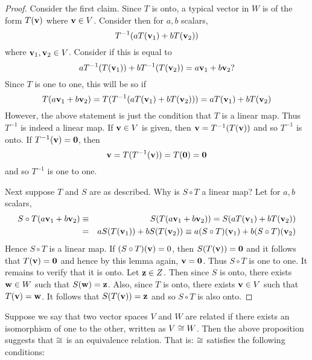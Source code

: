 \begin{proof}
Consider the first claim. Since $T$ is onto, a typical
vector in $W$ is of the form $T(\mbox{\bf v})$ where $\mbox{\bf v} \in V$. Consider then for $a,b$
scalars,
\begin{equation*}
T^{-1}(aT(\mbox{\bf v}_{1})+bT(\mbox{\bf v}_{2}))
\end{equation*}
where $\mbox{\bf v}_{1}, \mbox{\bf v}_2 \in V$. Consider if this is equal to
\begin{equation*}
aT^{-1}(T(\mbox{\bf v}_{1})) +bT^{-1}(T(\mbox{\bf v}_{2})) =a\mbox{\bf v}_{1}+b\mbox{\bf v}_{2}?
\end{equation*}
Since $T$ is one to one, this will be so if
\begin{equation*}
T(a\mbox{\bf v}_{1}+b\mbox{\bf v}_{2}) =T(T^{-1}(aT(\mbox{\bf v}_{1})+bT(\mbox{\bf v}_{2}))
) =aT(\mbox{\bf v}_{1})+bT(\mbox{\bf v}_{2})
\end{equation*}
However, the above statement is just the condition that $T$ is a linear map.
Thus $T^{-1}$ is indeed a linear map. If $\mbox{\bf v} \in V$ is given, then $
\mbox{\bf v}=T^{-1}(T(\mbox{\bf v})) $ and so $T^{-1}$ is onto. If $T^{-1}(\mbox{\bf v})=\mbox{\bf 0}$, then
\begin{equation*}
\mbox{\bf v}=T(T^{-1}(\mbox{\bf v})) =T(\mbox{\bf 0})=\mbox{\bf 0}
\end{equation*}
and so  $T^{-1}$ is one to one.

Next suppose $T$ and $S$ are as described. Why is $S\circ T$ a linear map?
Let for $a,b$ scalars,
\begin{eqnarray*}
S\circ T(a\mbox{\bf v}_{1}+b\mbox{\bf v}_{2}) &\equiv &S(T(
a\mbox{\bf v}_{1}+b\mbox{\bf v}_{2})) =S(aT(\mbox{\bf v}_{1})+bT(\mbox{\bf v}_{2})) \\
&=&aS(T(\mbox{\bf v}_{1})) +bS(T(\mbox{\bf v}_{2})) \equiv a(S\circ
T) (\mbox{\bf v}_{1}) +b(S\circ T) (\mbox{\bf v}_{2})
\end{eqnarray*}
Hence $S\circ T$ is a linear map. If $(S\circ T) (\mbox{\bf v})
=0$, then $S(T(\mbox{\bf v})) =\mbox{\bf 0}$ and it follows that $T(\mbox{\bf v})=\mbox{\bf 0}$ and hence by this lemma again, $\mbox{\bf v}=\mbox{\bf 0}$. Thus $S\circ
T $ is one to one. It remains to verify that it is onto. Let $\mbox{\bf z}\in Z$. Then
since $S$ is onto, there exists $\mbox{\bf w}\in W$ such that $S(\mbox{\bf w})=\mbox{\bf z}$. Also, since $T$
is onto, there exists $\mbox{\bf v}\in V$ such that $T(\mbox{\bf v})=\mbox{\bf w}$. It follows that $S(
T(\mbox{\bf v})) =\mbox{\bf z}$ and so $S\circ T$ is also onto.
\end{proof}

Suppose we say that two vector spaces $V$ and $W$ are related if there exists an isomorphism of one to the other, written as $V\cong W$.
Then the above proposition suggests that $\cong$ is an equivalence relation. That is: $\cong$
satisfies the following conditions:

